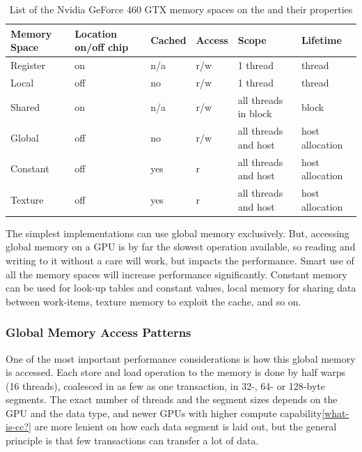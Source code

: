 \begin{table}
  \begin{tabular}{|l|l|l|l|l|l|}
    \hline
    Memory Space & Location on/off chip & Cached & Access & Scope                & Lifetime        \\ \hline
    Register     & on                   & n/a    & r/w    & 1 thread             & thread          \\
    Local        & off                  & no     & r/w    & 1 thread             & thread          \\
    Shared       & on                   & n/a    & r/w    & all threads in block & block           \\
    Global       & off                  & no     & r/w    & all threads and host & host allocation \\
    Constant     & off                  & yes    & r      & all threads and host & host allocation \\
    Texture      & off                  & yes    & r      & all threads and host & host allocation \\
    \hline
  \end{tabular}
  \label{table:memory-properties}
  \caption{List of the Nvidia GeForce 460 GTX memory spaces on the and their properties}
\end{table}

The simplest implementations can use global memory exclusively. But,
accessing global memory on a GPU is by far the slowest operation
available, so reading and writing to it without a care will work, but
impacts the performance. Smart use of all the memory spaces will
increase performance significantly. Constant memory can be used for
look-up tables and constant values, local memory for sharing data
between work-items, texture memory to exploit the cache, and so on. 

\subsubsection{Global Memory Access Patterns}
\label{sect:global-memory-optimization}
One of the most important performance considerations is how this
global memory is accessed. Each store and load operation to the memory
is done by half warps (16 threads), coalesced in as few as one
transaction, in 32-, 64- or 128-byte segments. The exact number of
threads and the segment sizes depends on the GPU and the data type,
and newer GPUs with higher compute capability\ref{what-is-cc?} are
more lenient on how each data segment is laid out, but the general
principle is that few transactions can transfer a lot of data.

